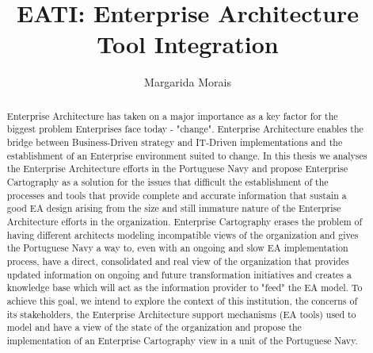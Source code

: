 \documentclass[runningheads]{llncs}
\begin{document}
%
\title{EATI: Enterprise Architecture Tool Integration}
%
%
\author{Margarida Morais}

%
%
%
\maketitle              %
%
\begin{abstract}
Enterprise Architecture has taken on a major importance as a key factor for the biggest problem Enterprises face today - "change". 
Enterprise Architecture enables the bridge between Business-Driven strategy and IT-Driven implementations and the establishment of an Enterprise environment suited to change.
In this thesis we analyses the Enterprise Architecture efforts in the Portuguese Navy and propose Enterprise Cartography as a solution for the issues that difficult the establishment of the processes and tools that provide complete and accurate information that sustain a good EA design arising from the size and still immature nature of the Enterprise Architecture efforts in the organization.
Enterprise Cartography erases the problem of having different architects modeling incompatible views of the organization and gives the Portuguese Navy a way to, even with an ongoing and slow EA implementation process, have a direct, consolidated and real view of the organization that provides updated information on ongoing and future transformation initiatives and creates a knowledge base which will act as the information provider to "feed" the EA model.
To achieve this goal, we intend to explore the context of this institution, the concerns of its stakeholders, the Enterprise Architecture support mechanisms (EA tools) used to model and have a view of the state of the organization and propose the implementation of an Enterprise Cartography view in a unit of the Portuguese Navy. 

\end{abstract}
%
%
%
\end{document}
